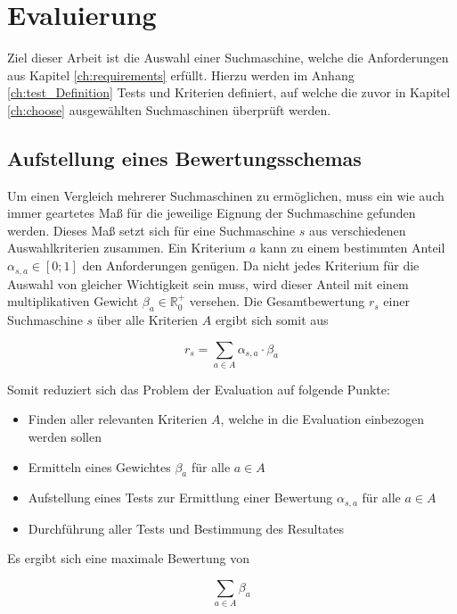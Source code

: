 \chapter{Evaluierung}
\label{ch:eval}
Ziel dieser Arbeit ist die Auswahl einer Suchmaschine, welche die Anforderungen aus Kapitel \ref{ch:requirements} erfüllt. Hierzu werden im Anhang \ref{ch:test_Definition} Tests und Kriterien definiert, auf welche die zuvor in Kapitel \ref{ch:choose} ausgewählten Suchmaschinen überprüft werden.

\section{Aufstellung eines Bewertungsschemas}

Um einen Vergleich mehrerer Suchmaschinen zu ermöglichen, muss ein wie auch immer geartetes Maß für die jeweilige Eignung der Suchmaschine gefunden werden. Dieses Maß setzt sich für eine Suchmaschine $s$ aus verschiedenen Auswahlkriterien zusammen. Ein Kriterium $a$ kann zu einem bestimmten Anteil $\alpha_{s,a} \in [0;1]$ den Anforderungen genügen. Da nicht jedes Kriterium für die Auswahl von gleicher Wichtigkeit sein muss, wird dieser Anteil mit einem multiplikativen Gewicht $\beta_{a} \in \mathbb{R}_0^+$ versehen. Die Gesamtbewertung $r_s$ einer Suchmaschine $s$ über alle Kriterien $A$ ergibt sich somit aus

\begin{equation}
	r_s = \sum_{a \in A} \alpha_{s,a} \cdot \beta_{a}
\end{equation}

Somit reduziert sich das Problem der Evaluation auf folgende Punkte:

\begin{itemize}
	\item Finden aller relevanten Kriterien $A$, welche in die Evaluation einbezogen werden sollen
	\item Ermitteln eines Gewichtes $\beta_{a}$ für alle $a \in A$
	\item Aufstellung eines Tests zur Ermittlung einer Bewertung $\alpha_{s,a} $ für alle $ a \in A$
	\item Durchführung aller Tests und Bestimmung des Resultates
\end{itemize}

Es ergibt sich eine maximale Bewertung von

\begin{equation}
	\sum_{a \in A} \beta_{a}
\end{equation}


